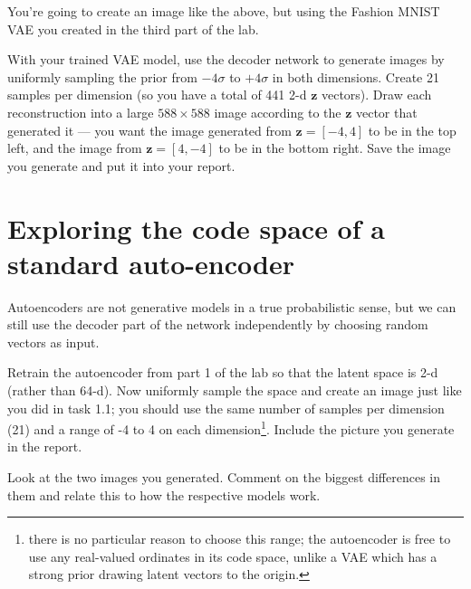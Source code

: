 \documentclass[a4paper]{article}
\begin{document}
\begin{tcolorbox}[title=1.1 Systematically sample a VAE (2 marks)]
You're going to create an image like the above, but using the Fashion MNIST VAE you created in the third part of the lab.

With your trained VAE model, use the decoder network to generate images by uniformly sampling the prior from $-4\sigma$ to $+4\sigma$ in both dimensions. Create 21 samples per dimension (so you have a total of 441 2-d $\bm z$ vectors). Draw each reconstruction into a large $588\times588$ image according to the $\bm z$ vector that generated it --- you want the image generated from $\bm z = [-4,4]$ to be in the top left, and the image from $\bm z = [4,-4]$ to be in the bottom right. Save the image you generate and put it into your report.
\end{tcolorbox}

\section{Exploring the code space of a standard auto-encoder}\label{ae}
Autoencoders are not generative models in a true probabilistic sense, but we can still use the decoder part of the network independently by choosing random vectors as input. 

\begin{tcolorbox}[title=2.1 Systematically sample an Autoencoder (2 marks)]
Retrain the autoencoder from part 1 of the lab so that the latent space is 2-d (rather than 64-d). Now uniformly sample the space and create an image just like you did in task 1.1; you should use the same number of samples per dimension (21) and a range of -4 to 4 on each dimension\footnote{there is no particular reason to choose this range; the autoencoder is free to use any real-valued ordinates in its code space, unlike a VAE which has a strong prior drawing latent vectors to the origin.}. Include the picture you generate in the report.
\end{tcolorbox}

\begin{tcolorbox}[title=2.2 Compare the latent spaces of the VAE and autoencoder (1 mark)]
Look at the two images you generated. Comment on the biggest differences in them and relate this to how the respective models work.
\end{tcolorbox}
\end{document}
